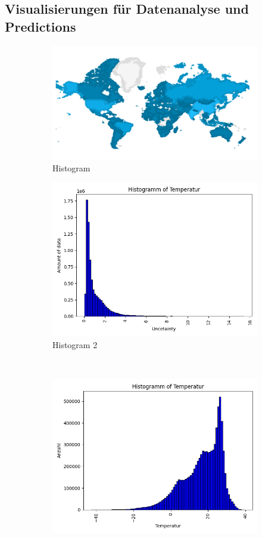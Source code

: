 \documentclass[manuscript,screen,review]{acmart}
\begin{document}
\subsection{Visualisierungen für Datenanalyse und Predictions}
\begin{figure}[htp]
  \centering
  \begin{subfigure}{.45\textwidth}
      \centering
      \includegraphics[width=.8\linewidth]{./histograms/map_plot_data_points}
      \caption{Histogram}
      \label{fig:sub1}
  \end{subfigure}%
  \begin{subfigure}{.45\textwidth}
      \centering
      \includegraphics[width=.8\linewidth]{./histograms/Uncertainty}
      \caption{Histogram 2}
      \label{fig:sub2}
  \end{subfigure}\\
  \begin{subfigure}{.45\textwidth}
      \centering
      \includegraphics[width=.8\linewidth]{./histograms/Temperatur}

\end{subfigure}
\end{figure}
\end{document}

